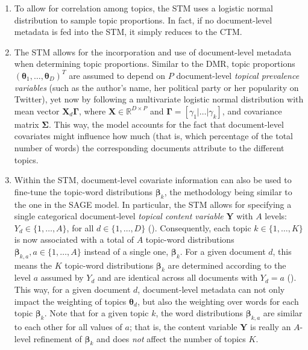 \documentclass[12pt]{article}
\begin{document}
\begin{enumerate}[label=(\roman*)]
\vspace{-0.25cm}
\item To allow for correlation among topics, the STM uses a logistic normal distribution to sample topic proportions. In fact, if no document-level metadata is fed into the STM, it simply reduces to the CTM.
\vspace{-0.25cm}
\item The STM allows for the incorporation and use of document-level metadata when determining topic proportions. Similar to the DMR, topic proportions $(\boldsymbol{\theta}_1,\dots,\boldsymbol{\theta}_D)^T$ are assumed to depend on $P$ document-level \textit{topical prevalence variables} (such as the author's name, her political party or her popularity on Twitter), yet now by following a multivariate logistic normal distribution with mean vector $\boldsymbol{X}_d\boldsymbol{\Gamma}$, where $\boldsymbol{X} \in \mathbb{R}^{D \times P}$ and $\boldsymbol{\Gamma} = [\gamma_1|\dots|\gamma_k]$, and covariance matrix $\boldsymbol{\Sigma}$. This way, the model accounts for the fact that document-level covariates might influence how much (that is, which percentage of the total number of words) the corresponding documents attribute to the different topics.
\vspace{-0.25cm}
\item Within the STM, document-level covariate information can also be used to fine-tune the topic-word distributions $\boldsymbol{\beta}_k$, the methodology being similar to the one in the SAGE model. In particular, the STM allows for specifying a single categorical document-level \textit{topical content variable} $\boldsymbol{Y}$ with $A$ levels: $Y_d \in \{1,\dots,A\}$, for all $d \in \{1,\dots,D\}$ (\citealp{stm}). Consequently, each topic $k \in \{1,\dots,K\}$ is now associated with a total of $A$ topic-word distributions $\boldsymbol{\beta}_{k,a}, a \in \{1,\dots,A\}$ instead of a single one, $\boldsymbol{\beta}_k$. For a given document $d$, this means the $K$ topic-word distributions $\boldsymbol{\beta}_k$ are determined according to the level $a$ assumed by $Y_d$ and are identical across all documents with $Y_d = a$ (\citealp{roberts2016model}). This way, for a given document $d$, document-level metadata can not only impact the weighting of topics $\boldsymbol{\theta}_d$, but also the weighting over words for each topic $\boldsymbol{\beta}_k$. Note that for a given topic $k$, the word distributions $\boldsymbol{\beta}_{k,a}$ are similar to each other for all values of $a$; that is, the content variable $\boldsymbol{Y}$ is really an $A$-level refinement of $\boldsymbol{\beta}_k$ and does \textit{not} affect the number of topics $K$.

\end{enumerate}
\end{document}
